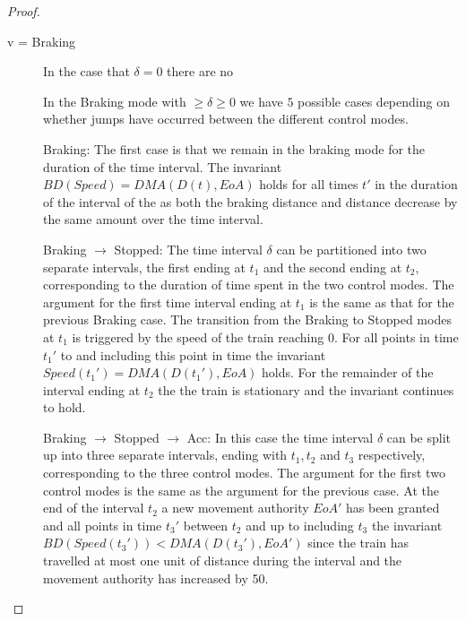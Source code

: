 \begin{mytheorem}
\begin{proof}
\begin{description}
\item[v = Braking]
In the case that $\delta = 0$ there are no 

In the Braking mode with  $\geq \delta \geq 0$ we have $5$ possible cases depending on whether jumps have occurred between the different control modes.

Braking: The first case is that we remain in the braking mode for the duration of the time interval. The invariant $BD(Speed) = DMA(D(t), EoA)$ holds for all times $t'$ in the duration of the interval of the as both the braking distance and distance decrease by the same amount over the time interval.

Braking $\to$ Stopped: The time interval $\delta$ can be partitioned into two separate intervals, the first ending at $t_1$ and the second ending at $t_2$, corresponding to the duration of time spent in the two control modes.  The argument for the first time interval  ending at $t_1$ is the same as that for the previous Braking case. 
The transition from the Braking to Stopped modes at $t_1$ is triggered by the speed of the train reaching $0$. For all points in time $t_1'$ to and including this point in time the invariant $Speed(t_1') = DMA(D(t_1'), EoA)$ holds. For the remainder of the interval ending at $t_2$ the the train is stationary and the invariant continues to hold. 

Braking $\to$ Stopped $\to$ Acc: In this case the time interval $\delta$ can be split up into three separate intervals, ending with $t_1,t_2$ and $t_3$  respectively, corresponding to the three control modes. The argument for the first two control modes is the same as the argument for the previous case. 
At the end of the interval $t_2$ a new movement authority $EoA'$ has been granted and all points in time $t_3'$ between $t_2$ and up to including $t_3$ the invariant $BD(Speed(t_3')) < DMA(D(t_3'), EoA')$ since the train has travelled at most one unit of distance during the interval and the movement authority has increased by 50.


\end{description}
\end{proof}
\end{mytheorem}
